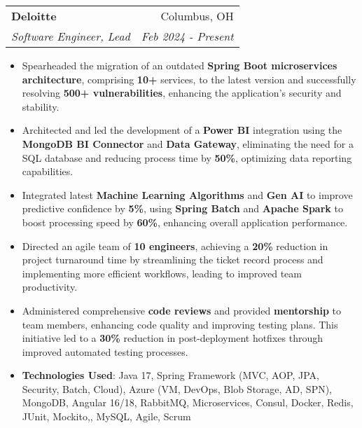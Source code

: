 \documentclass[letterpaper,11pt]{article}
\makeatletter
\newcommand{\resumeItem}[2]{
  \item\small{
    \textbf{#1}#2 \vspace{-2pt}
  }
}
\newcommand{\resumeSubheading}[4]{
  \vspace{-1pt}\item
    \begin{tabular*}{0.97\textwidth}[t]{l@{\extracolsep{\fill}}r}
      \textbf{#1} & #2 \\
      \textit{\small#3} & \textit{\small #4} \\
    \end{tabular*}\vspace{-5pt}
}
\newcommand{\resumeItemListStart}{\begin{itemize}}
\newcommand{\resumeItemListEnd}{\end{itemize}\vspace{-5pt}}
\makeatother
\begin{document}
    \resumeSubheading
    {Deloitte}{Columbus, OH}
    {Software Engineer, Lead}{Feb 2024 - Present}
    \resumeItemListStart
      \resumeItem{}
        {Spearheaded the migration of an outdated \textbf{Spring Boot microservices architecture}, comprising \textbf{10+} services, to the latest version and successfully resolving \textbf{500+ vulnerabilities}, enhancing the application's security and stability.}
      \resumeItem{}
        {Architected and led the development of a \textbf{Power BI} integration using the \textbf{MongoDB BI Connector} and \textbf{Data Gateway}, eliminating the need for a SQL database and reducing process time by \textbf{50\%}, optimizing data reporting capabilities.}
      \resumeItem{}
        {Integrated latest \textbf{Machine Learning Algorithms} and \textbf{Gen AI} to improve predictive confidence by \textbf{5\%}, using \textbf{Spring Batch} and \textbf{Apache Spark} to boost processing speed by \textbf{60\%}, enhancing overall application performance.}
      \resumeItem{}
        {Directed an agile team of \textbf{10 engineers}, achieving a \textbf{20\%} reduction in project turnaround time by streamlining the ticket record process and implementing more efficient workflows, leading to improved team productivity.}
      \resumeItem{}
        {Administered comprehensive \textbf{code reviews} and provided \textbf{mentorship} to team members, enhancing code quality and improving testing plans. This initiative led to a \textbf{30\%} reduction in post-deployment hotfixes through improved automated testing processes.}
      \resumeItem{Technologies Used}
        {: Java 17, Spring Framework (MVC, AOP, JPA, Security, Batch, Cloud), Azure (VM, DevOps, Blob Storage, AD, SPN), MongoDB, Angular 16/18, RabbitMQ, Microservices, Consul, Docker, Redis, JUnit, Mockito,, MySQL, Agile, Scrum}
    \resumeItemListEnd
\end{document}
